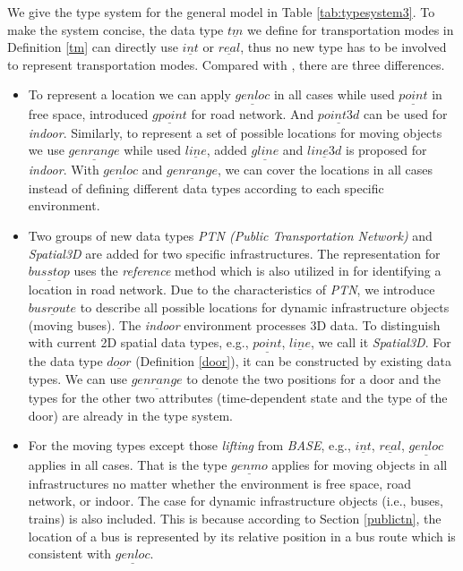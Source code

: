 We give the type system for the general model in Table \ref{tab:typesystem3}. To make the system concise, the data type $\underline{tm}$ we define for transportation modes in Definition \ref{tm} can 
directly use $\underline{int}$ or $\underline{real}$, thus no new type has to be involved to represent transportation modes. Compared with \cite{GBE+00,GA2006}, there are three differences. 
\begin{itemize}
 \item To represent a location we can apply $\underline{genloc}$ in all cases while \cite{GBE+00} used $\underline{point}$ in free space, \cite{GA2006} introduced $\underline{gpoint}$ 
for road network. And $\underline{point3d}$ can be used for \textit{indoor}. Similarly, to represent a set of possible locations for moving objects we use $\underline{genrange}$ while \cite{GBE+00} used $\underline{line}$, \cite{GA2006} added $\underline{gline}$ and $\underline{line3d}$ is proposed for \textit{indoor}. With $\underline{genloc}$ and $\underline{genrange}$, we can cover the locations in all cases instead of defining different data types according to 
each specific environment. 

  \item Two groups of new data types \textit{PTN (Public Transportation Network)} and 
\textit{Spatial3D} are added for two specific infrastructures. The representation
for $\underline{busstop}$ uses the \textit{reference} method which is also utilized in \cite{GA2006} for identifying a location in road network. Due to the characteristics of \textit{PTN}, we introduce
$\underline{busroute}$ to describe all possible locations for dynamic 
infrastructure objects (moving buses). 
The \textit{indoor} environment processes 3D data. To distinguish with 
current 2D spatial data types, e.g., $\underline{point}$, $\underline{line}$, we call it \textit{Spatial3D}. For the data type $\underline{door}$ (Definition \ref{door}), it can be constructed by existing data types. We can use $\underline{genrange}$ to denote the two positions for a door and the types for the other two attributes (time-dependent state and the type of the door) are already in the type system. 

  \item For the moving types except those \textit{lifting} from
\textit{BASE}, e.g., $\underline{int}$, $\underline{real}$, $\underline{genloc}$ applies in all 
cases. That is the type $\underline{genmo}$ applies for moving objects in all infrastructures no matter whether the environment is free space, road network, or indoor. The case for dynamic infrastructure objects (i.e., buses, trains) is also included. This is because according to Section \ref{publictn}, the location of a bus is represented by its relative position in
a bus route which is consistent with $\underline{genloc}$.

\end{itemize}


